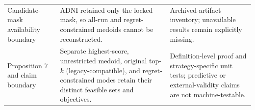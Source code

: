 \begin{table}[p]
\begin{tabularx}{\textwidth}{@{}>{\raggedright\arraybackslash}p{}>{\raggedright\arraybackslash}X>{\raggedright\arraybackslash}X@{}}
Candidate-mask availability boundary & ADNI retained only the locked mask, so all-run and regret-constrained medoids cannot be reconstructed. & Archived-artifact inventory; unavailable results remain explicitly missing. \\
Proposition 7 and claim boundary & Separate highest-score, unrestricted medoid, original top-$k$ (legacy-compatible), and regret-constrained modes retain their distinct feasible sets and objectives. & Definition-level proof and strategy-specific unit tests; predictive or external-validity claims are not machine-testable. \\
\bottomrule
\end{tabularx}
\end{table}
